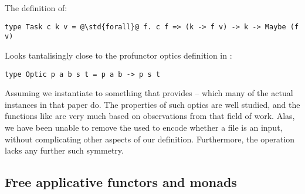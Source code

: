 The  definition of:

\begin{verbatim}
type Task c k v = @\std{forall}@ f. c f => (k -> f v) -> k -> Maybe (f v)
\end{verbatim}

Looks tantalisingly close to the profunctor optics definition in \cite{gibbons-profunctor-optics}:

\begin{verbatim}
type Optic p a b s t = p a b -> p s t
\end{verbatim}

Assuming we instantiate  to something that provides  -- which many of the actual instances in that paper do. The properties of such optics are well studied, and the functions like  are very much based on observations from that field of work. Alas, we have been unable to remove the  used to encode whether a file is an input, without complicating other aspects of our definition. Furthermore, the  operation lacks any further such symmetry.

\subsection{Free applicative functors and monads}\label{sec-related-free}

